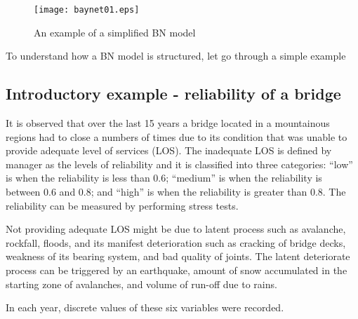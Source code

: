 \begin{figure}[h]
\begin{center}
\texttt{[image: baynet01.eps]}
\caption{An example of a simplified BN model}\label{baynet01}
\end{center}
\end{figure}

To understand how a BN model is structured, let go through a simple example
\subsection{Introductory example - reliability of a bridge}
It is observed that over the last 15 years a bridge located in a mountainous regions had to close a numbers of times due to its condition that was unable to provide adequate level of services (LOS). The inadequate LOS is defined by manager as the levels of reliability and it is classified into three categories: ``low'' is when the reliability is less than 0.6; ``medium'' is when the reliability is between 0.6 and 0.8; and ``high'' is when the reliability is greater than 0.8. The reliability can be measured by performing stress tests.

Not providing adequate LOS might be due to latent process such as avalanche, rockfall, floods, and its manifest deterioration such as cracking of bridge decks, weakness of its bearing system, and bad quality of joints. The latent deteriorate process can be triggered by an earthquake, amount of snow accumulated in the starting zone of avalanches, and volume of run-off due to rains. 

In each year, discrete values of these six variables were recorded. 

